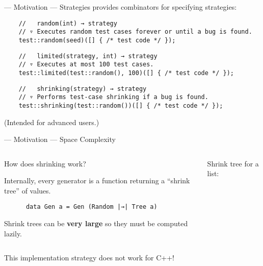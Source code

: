 \begin{frame}[fragile]{\halcheck{} --- Motivation --- Strategies}
  \halcheck{} provides combinators for specifying strategies:

  \begin{verbatim}
    //   random(int) → strategy
    // ▿ Executes random test cases forever or until a bug is found.
    test::random(seed)([] { /* test code */ });
  \end{verbatim}

  \pause{}

  \begin{verbatim}
    //   limited(strategy, int) → strategy
    // ▿ Executes at most 100 test cases.
    test::limited(test::random(), 100)([] { /* test code */ });
  \end{verbatim}

  \pause{}

  \begin{verbatim}
    //   shrinking(strategy) → strategy
    // ▿ Performs test-case shrinking if a bug is found.
    test::shrinking(test::random())([] { /* test code */ });
  \end{verbatim}

  \pause{}

  (Intended for advanced users.)
\end{frame}


\begin{frame}[fragile]{\halcheck{} --- Motivation --- Space Complexity}
  \begin{columns}[t]
    \begin{block}{How does shrinking work?}
      \bigskip

      Internally, every generator is a function returning a ``shrink tree'' of values.

      \bigskip

      \begin{verbatim}
      data Gen a = Gen (Random |→| Tree a)
      \end{verbatim}

      \bigskip

      Shrink trees can be \textbf{very large} so they must be computed lazily.
    \end{block}

    \begin{block}{Shrink tree for a list:}
    \end{block}
  \end{columns}

  \pause{}

  This implementation strategy \alert{does not work for C++!}
\end{frame}

